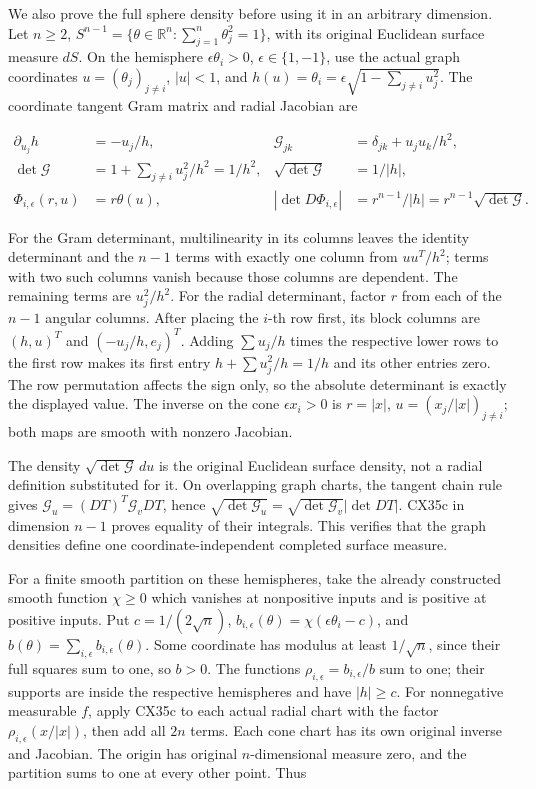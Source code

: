 \documentclass[
  11pt,
]{article}
\begin{document}
We also prove the full sphere density before using it in an arbitrary
dimension. Let \(n\geq2\),
\(S^{n-1}=\{\theta\in\mathbb R^n:\sum_{j=1}^n\theta_j^2=1\}\), with its
original Euclidean surface measure \(dS\). On the hemisphere
\(\epsilon\theta_i>0\), \(\epsilon\in\{1,-1\}\), use the actual graph
coordinates \(u=(\theta_j)_{j\ne i}\), \(|u|<1\), and
\(h(u)=\theta_i=\epsilon\sqrt{1-\sum_{j\ne i}u_j^2}\). The coordinate
tangent Gram matrix and radial Jacobian are

\[
\begin{aligned}
\partial_{u_j}h&=-u_j/h,&
\mathcal G_{jk}&=\delta_{jk}+u_ju_k/h^2,\\
\det\mathcal G&=1+\sum_{j\ne i}u_j^2/h^2=1/h^2,&
\sqrt{\det\mathcal G}&=1/|h|,\\
\Phi_{i,\epsilon}(r,u)&=r\theta(u),&
|\det D\Phi_{i,\epsilon}|&=r^{n-1}/|h|
                  =r^{n-1}\sqrt{\det\mathcal G}.
\end{aligned}
\tag{CX37a}
\]

For the Gram determinant, multilinearity in its columns leaves the
identity determinant and the \(n-1\) terms with exactly one column from
\(u u^T/h^2\); terms with two such columns vanish because those columns
are dependent. The remaining terms are \(u_j^2/h^2\). For the radial
determinant, factor \(r\) from each of the \(n-1\) angular columns.
After placing the \(i\)-th row first, its block columns are \((h,u)^T\)
and \((-u_j/h,e_j)^T\). Adding \(\sum u_j/h\) times the respective lower
rows to the first row makes its first entry \(h+\sum u_j^2/h=1/h\) and
its other entries zero. The row permutation affects the sign only, so
the absolute determinant is exactly the displayed value. The inverse on
the cone \(\epsilon x_i>0\) is \(r=|x|\), \(u=(x_j/|x|)_{j\ne i}\); both
maps are smooth with nonzero Jacobian.

The density \(\sqrt{\det\mathcal G}\,du\) is the original Euclidean
surface density, not a radial definition substituted for it. On
overlapping graph charts, the tangent chain rule gives
\(\mathcal G_u=(DT)^T\mathcal G_vDT\), hence
\(\sqrt{\det\mathcal G_u}=\sqrt{\det\mathcal G_v}|\det DT|\). CX35c in
dimension \(n-1\) proves equality of their integrals. This verifies that
the graph densities define one coordinate-independent completed surface
measure.

For a finite smooth partition on these hemispheres, take the already
constructed smooth function \(\chi\geq0\) which vanishes at nonpositive
inputs and is positive at positive inputs. Put \(c=1/(2\sqrt n)\),
\(b_{i,\epsilon}(\theta)=\chi(\epsilon\theta_i-c)\), and
\(b(\theta)=\sum_{i,\epsilon}b_{i,\epsilon}(\theta)\). Some coordinate
has modulus at least \(1/\sqrt n\), since their full squares sum to one,
so \(b>0\). The functions \(\rho_{i,\epsilon}=b_{i,\epsilon}/b\) sum to
one; their supports are inside the respective hemispheres and have
\(|h|\geq c\). For nonnegative measurable \(f\), apply CX35c to each
actual radial chart with the factor \(\rho_{i,\epsilon}(x/|x|)\), then
add all \(2n\) terms. Each cone chart has its own original inverse and
Jacobian. The origin has original \(n\)-dimensional measure zero, and
the partition sums to one at every other point. Thus
\end{document}
